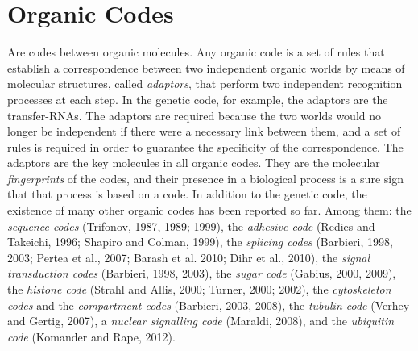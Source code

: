 \documentclass[12pt]{article}
\begin{document}
\section{Organic Codes}
Are codes between organic molecules. Any organic code is a set of rules that establish a correspondence between two independent organic worlds by means of molecular structures, called \textit{adaptors}, that perform two independent recognition processes at each step. In the genetic code, for example, the adaptors are the transfer-RNAs. The adaptors are required because the two worlds would no longer be independent if there were a necessary link between them, and a set of rules is required in order to guarantee the specificity of the correspondence. The adaptors are the key molecules in all organic codes. They are the molecular \textit{fingerprints} of the codes, and their presence in a biological process is a sure sign that that process is based on a code. In addition to the genetic code, the existence of many other organic codes has been reported so far. Among them: the \textit{sequence codes} (Trifonov, 1987, 1989; 1999), the \textit{adhesive code} (Redies and Takeichi, 1996; Shapiro and Colman, 1999), the \textit{splicing codes} (Barbieri, 1998, 2003; Pertea et al., 2007; Barash et al. 2010; Dihr et al., 2010), the \textit{signal transduction codes} (Barbieri, 1998, 2003), the \textit{sugar code} (Gabius, 2000, 2009), the \textit{histone code} (Strahl and Allis, 2000; Turner, 2000; 2002), the \textit{cytoskeleton codes} and the \textit{compartment codes} (Barbieri, 2003, 2008), the \textit{tubulin code} (Verhey and Gertig, 2007), a \textit{nuclear signalling code} (Maraldi, 2008), and the \textit{ubiquitin code} (Komander and Rape, 2012). 
\end{document}

